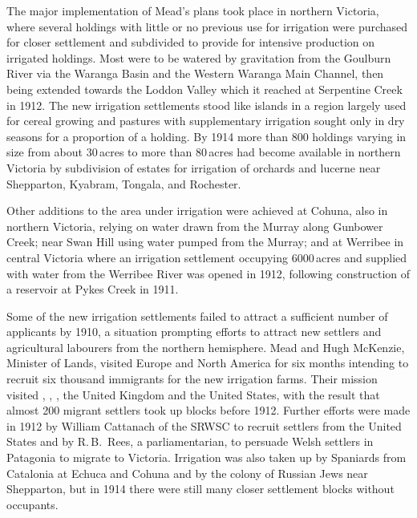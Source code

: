 The major implementation of Mead's plans took place in northern
Victoria, where several holdings with little or no previous use for
irrigation were purchased for closer settlement and subdivided to
provide for intensive production on irrigated holdings.  Most were to
be watered by gravitation from the Goulburn River via the Waranga
Basin and the Western Waranga Main Channel, then being extended towards the Loddon Valley which it
reached at Serpentine Creek  in 1912.  The new
irrigation settlements stood like islands in a region largely used for
cereal growing and pastures with supplementary
irrigation sought only in dry seasons for a proportion of a holding.
By 1914 more than 800 holdings varying in size from about 30\,acres to
more than 80\,acres had become available in northern Victoria by
subdivision of estates for irrigation of orchards and
lucerne near Shepparton, Kyabram, Tongala, and
Rochester.

Other additions to the area under irrigation were achieved at Cohuna,
also in northern Victoria, relying on water drawn from the Murray
along Gunbower Creek; near Swan Hill using water
pumped from the Murray; and at Werribee in central
Victoria where an irrigation settlement occupying 6000\,acres and
supplied with water from the Werribee River was
opened in 1912, following construction of a reservoir at
Pykes Creek in 1911.

Some of the new irrigation settlements failed to attract a sufficient
number of applicants by 1910, a situation prompting efforts to attract
new settlers and agricultural labourers from the northern hemisphere.
Mead and Hugh McKenzie, Minister of Lands, visited
Europe and Nor\-th America for six months
intending to recruit six thousand immigrants for the new irrigation
farms. Their mission visited \index{Italy}, \index{Sweden},
, the United Kingdom and the
United States, with the result that almost 200 migrant
settlers took up blocks before 1912.  Further efforts were made in
1912 by William \index{Cattanach, W.}Cattanach of the SRWSC to recruit
settlers from the United States and by R.\,B.~Rees, a parliamentarian,
to persuade \index{Welsh}Welsh settlers in Patagonia to migrate to
Victoria.  Irrigation was also taken up by \index{Spanish}Spaniards
from Catalonia at Echuca and Cohuna and by the colony of
Russian Jews near Shepparton, but in 1914 there were
still many closer settlement blocks without occupants.


